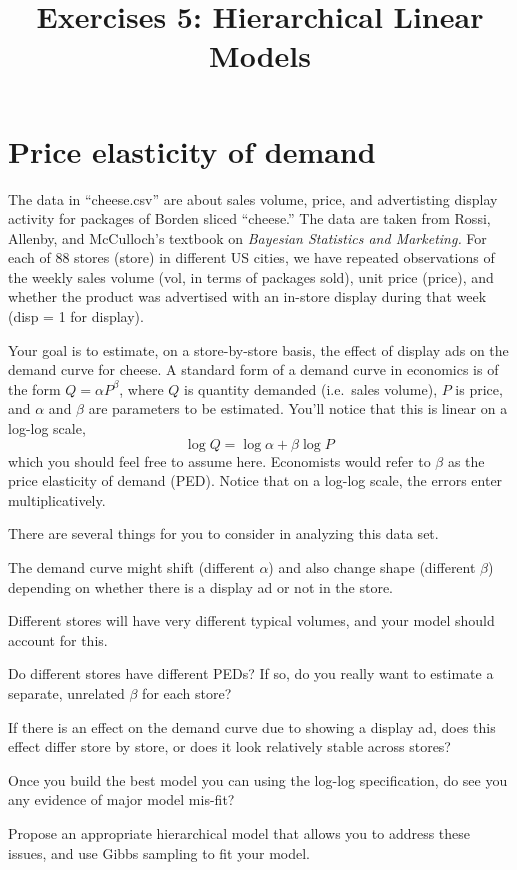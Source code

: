 \documentclass{mynotes}
\title[Exercises 4 $\cdot$ SSC 383D]{Exercises 5: Hierarchical Linear Models}
\date{}  %
\begin{document}
\maketitle%


\section{Price elasticity of demand}

The data in ``cheese.csv'' are about sales volume, price, and advertisting display activity for packages of Borden sliced ``cheese.'' The data are taken from Rossi, Allenby, and McCulloch's textbook on \textit{Bayesian Statistics and Marketing.} For each of 88 stores (store) in different US cities, we have repeated observations of the weekly sales volume (vol, in terms of packages sold), unit price (price), and whether the product was advertised with an in-store display during that week (disp = 1 for display).

Your goal is to estimate, on a store-by-store basis, the effect of display ads on the demand curve for cheese.  A standard form of a demand curve in economics is of the form $Q = \alpha P^\beta$, where $Q$ is quantity demanded (i.e.~sales volume), $P$ is price, and $\alpha$ and $\beta$ are parameters to be estimated.  You'll notice that this is linear on a log-log scale,
$$
\log Q = \log \alpha + \beta \log P \,
$$
which you should feel free to assume here.  Economists would refer to $\beta$ as the price elasticity of demand (PED).  Notice that on a log-log scale, the errors enter multiplicatively.

There are several things for you to consider in analyzing this data set.
\begin{compactenum}
\item The demand curve might shift (different $\alpha$) and also change shape (different $\beta$) depending on whether there is a display ad or not in the store.
\item Different stores will have very different typical volumes, and your model should account for this.
\item Do different stores have different PEDs?  If so, do you really want to estimate a separate, unrelated $\beta$ for each store?
\item If there is an effect on the demand curve due to showing a display ad, does this effect differ store by store, or does it look relatively stable across stores?
\item Once you build the best model you can using the log-log specification, do see you any evidence of major model mis-fit?
\end{compactenum}
Propose an appropriate hierarchical model that allows you to address these issues, and use Gibbs sampling to fit your model.
\end{document}
